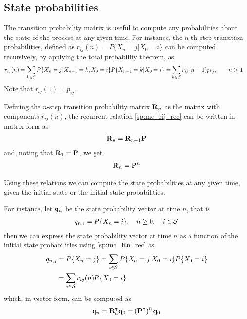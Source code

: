 \subsection{State probabilities}

The transition probability matrix is useful to compute any probabilities about the state of the process at any given time. For instance, the $n$-th step transition probabilities, defined as $r_{ij}(n) = P\{X_n = j | X_0 = i\}$ can be computed recursively, by applying the total probability theorem, as
\begin{align}
r_{ij}(n) 
	&= \sum_{k \in {\cal S}} P\{X_n = j | X_{n-1} = k,  X_0 = i\} P\{X_{n-1} = k | X_0 = i\}  
	 = \sum_{k \in {\cal S}} r_{ik}(n-1) p_{kj},  \qquad n > 1 
\label{sp:mc_rij_rec}	
\end{align}
Note that $r_{ij}(1)= p_{ij}$. 

Defining the $n$-step transition probability  matrix ${\bf R}_n$ as the matrix with components $r_{ij}(n)$, the recurrent relation \eqref{sp:mc_rij_rec} can be written in matrix form as
\begin{align}
{\bf R}_n = {\bf R}_{n-1}{\bf P}
\end{align}
and, noting that ${\bf R}_1={\bf P}$, we get
\begin{align}
{\bf R}_n = {\bf P}^n
\label{sp:mc_Rn_rec}	
\end{align}

Using these relations we can compute the state probabilities at any given time, given the initial state or the initial state probabilities.

For instance, let ${\bf q}_n$ be the state probability vector at time $n$, that is
\begin{align}
q_{n,i} = P\{X_n = i\},    \quad n \ge 0, \quad {i \in {\cal S}}
\end{align}
then we can express the state probability vector at time $n$ as a function of the initial state probabilities using \eqref{sp:mc_Rn_rec} as
\begin{align}
q_{n,j} &= P\{X_n = j\} 
         = \sum_{i \in {\cal S}} P\{X_n = j | X_0 = i\} P\{X_0 = i\} \nonumber\\
        &= \sum_{i \in {\cal S}}  r_{ij}(n) P\{X_0 = i\}
\end{align}
which, in vector form, can be computed as
\begin{align}
{\bf q}_n = {\bf R}_n^\intercal {\bf q}_0 = \left({\bf P}^\intercal\right)^n {\bf q}_0
\end{align}

